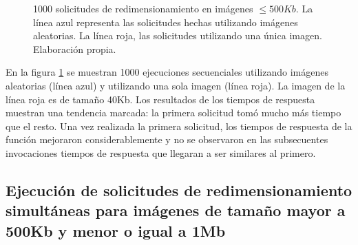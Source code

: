 \begin{figure}[h]
\hspace{-1.0cm}
\caption[\hspace{0.2cm} 1000 solicitudes de redimensionamiento en imágenes $\leq 500Kb$.]{1000 solicitudes de redimensionamiento en imágenes $\leq 500Kb$. La línea azul representa las solicitudes hechas utilizando imágenes aleatorias. La línea roja, las solicitudes utilizando una única imagen. Elaboración propia.}
\label{fig:1000-ejecuciones-secuenciales-500kb}
\end{figure}

En la figura \ref{fig:1000-ejecuciones-secuenciales-500kb} se muestran 1000 ejecuciones secuenciales utilizando imágenes aleatorias (línea azul) y utilizando una sola imagen (línea roja). La imagen de la línea roja es de tamaño 40Kb. Los resultados de los tiempos de respuesta muestran una tendencia marcada: la primera solicitud tomó mucho más tiempo que el resto. Una vez realizada la primera solicitud, los tiempos de respuesta de la función mejoraron considerablemente y no se observaron en las subsecuentes invocaciones tiempos de respuesta que llegaran a ser similares al primero. 


\subsection{Ejecución de solicitudes de redimensionamiento simultáneas para imágenes de tamaño mayor a 500Kb y menor o igual a 1Mb}

